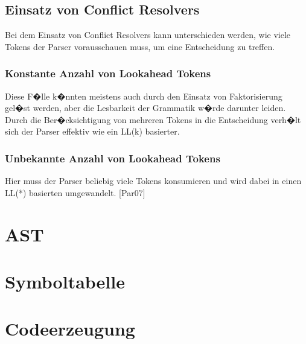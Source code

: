 \subsection{Einsatz von Conflict Resolvers}
Bei dem Einsatz von Conflict Resolvers kann unterschieden werden, wie viele Tokens der Parser vorausschauen muss, um eine Entscheidung zu treffen.

\subsubsection{Konstante Anzahl von Lookahead Tokens}
Diese F�lle k�nnten meistens auch durch den Einsatz von Faktorisierung gel�st werden, aber die Lesbarkeit der Grammatik w�rde darunter leiden. Durch die Ber�cksichtigung von mehreren Tokens in die Entscheidung verh�lt sich der Parser effektiv wie ein LL(k) basierter.

\subsubsection{Unbekannte Anzahl von Lookahead Tokens}
Hier muss der Parser beliebig viele Tokens konsumieren und wird dabei in einen LL(*) basierten umgewandelt. [Par07]

\section{AST}
\section{Symboltabelle}
\section{Codeerzeugung}
